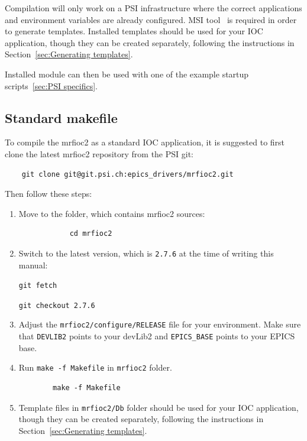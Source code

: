 \documentclass[12pt,a4paper]{article}
\newcommand{\latestDriverVersion}{2.7.6}
\begin{document}
Compilation will only work on a PSI infrastructure where the correct applications and environment variables are already configured. MSI tool~\cite{msi} is required in order to generate templates. Installed templates should be used for your IOC application, though they can be created separately, following the instructions in Section~\ref{sec:Generating templates}.

Installed module can then be used with one of the example startup scripts~\ref{sec:PSI specifics}.

\subsection{Standard makefile}\label{sec:Standard makefile}
To compile the mrfioc2 as a standard IOC application, it is suggested to first clone the latest mrfioc2 repository from the PSI git: 
\begin{verbatim}
	git clone git@git.psi.ch:epics_drivers/mrfioc2.git
\end{verbatim}

Then follow these steps:
\begin{enumerate}
	\item 
		Move to the folder, which contains mrfioc2 sources:
		\begin{verbatim}
			cd mrfioc2
		\end{verbatim}
		
	\item 
		Switch to the latest version, which is \texttt{\latestDriverVersion} at the time of writing this manual:
		
		\texttt{git fetch}
		
		\texttt{git checkout \latestDriverVersion}
		
	\item 
		Adjust the \texttt{mrfioc2/configure/RELEASE} file for your environment. Make sure that \texttt{DEVLIB2} points to your devLib2 and \texttt{EPICS\_BASE} points to your EPICS base.
	\item 
		Run \texttt{make -f Makefile} in \texttt{mrfioc2} folder.
		\begin{verbatim}
		make -f Makefile
		\end{verbatim}
	\item 
		Template files in \texttt{mrfioc2/Db} folder should be used for your IOC application, though they can be created separately, following the instructions in Section~\ref{sec:Generating templates}.
\end{enumerate}
\end{document}
